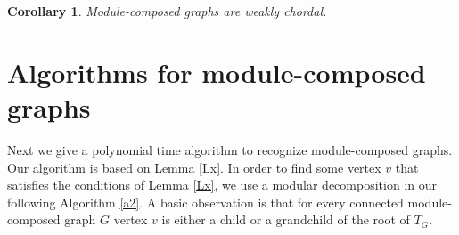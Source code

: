 \documentclass[11pt]{article}
\newtheorem{corollary}[theorem]{Corollary}
\begin{document}
\begin{corollary}
Module-composed graphs are weakly chordal.
\end{corollary}




\section{Algorithms for module-composed graphs}




Next we give a polynomial time algorithm to recognize module-composed graphs.
Our algorithm is based on Lemma \ref{Lx}. In order to find some vertex $v$ that satisfies the 
conditions of Lemma \ref{Lx}, we use a modular decomposition \cite{CH94} 
in our following Algorithm \ref{a2}. A basic observation is that for every connected module-composed
graph $G$ vertex $v$ is either a child or a grandchild of the root of $T_G$.
\end{document}
